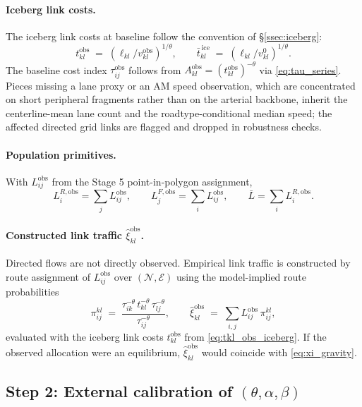 \documentclass[12pt]{article}
\newcommand{\N}{\mathcal N}
\newcommand{\E}{\mathcal E}
\newcommand{\Lbar}{\bar L}
\newcommand{\tbar}{\bar t}
\newcommand{\tkl}{t_{kl}}
\newcommand{\tijk}{\tau_{ij}}
\newcommand{\obs}{\mathrm{obs}}
\begin{document}
\paragraph{Iceberg link costs.}
The iceberg link costs at baseline follow the convention of
\S\ref{ssec:iceberg}:
\begin{equation}
  \tkl^{\obs}\;=\;(\ell_{kl}/v_{kl}^{\obs})^{1/\theta},
  \qquad
  \tbar_{kl}^{\,\mathrm{ice}}\;=\;(\ell_{kl}/v^{0}_{kl})^{1/\theta}.
  \label{eq:tkl_obs_iceberg}
\end{equation}
The baseline cost index $\tijk^{\obs}$ follows from
$A^{\obs}_{kl}=(\tkl^{\obs})^{-\theta}$ via \eqref{eq:tau_series}.
Pieces missing a lane proxy or an AM speed observation, which are
concentrated on short peripheral fragments rather than on the
arterial backbone, inherit the centerline-mean lane count and the
roadtype-conditional median speed; the affected directed grid links
are flagged and dropped in robustness checks.

\paragraph{Population primitives.}
With $L_{ij}^{\obs}$ from the Stage 5 point-in-polygon assignment,
\[
  L_i^{R,\obs}=\sum_j L_{ij}^{\obs},
  \qquad
  L_j^{F,\obs}=\sum_i L_{ij}^{\obs},
  \qquad
  \Lbar=\sum_i L_i^{R,\obs}.
\]

\paragraph{Constructed link traffic $\hat\xi_{kl}^{\obs}$.}\label{ssec:link_traffic_obs}
Directed flows are not directly observed.  Empirical link traffic is
constructed by route assignment of $L_{ij}^{\obs}$ over $(\N,\E)$
using the model-implied route probabilities
\begin{equation}
  \pi^{kl}_{ij}\;=\;\frac{\tau_{ik}^{-\theta}\,\tkl^{-\theta}\,\tau_{lj}^{-\theta}}
                          {\tijk^{-\theta}},
  \qquad
  \hat\xi_{kl}^{\obs}\;=\;\sum_{i,j}L_{ij}^{\obs}\,\pi^{kl}_{ij},
  \label{eq:hat_xi_obs}
\end{equation}
evaluated with the iceberg link costs $\tkl^{\obs}$ from
\eqref{eq:tkl_obs_iceberg}.  If the observed allocation were an
equilibrium, $\hat\xi_{kl}^{\obs}$ would coincide with
\eqref{eq:xi_gravity}.

\subsection{Step 2: External calibration of $(\theta,\alpha,\beta)$}
\label{ssec:calibration}
\end{document}
